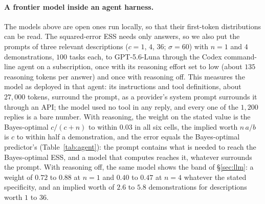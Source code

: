 \documentclass{article}
\begin{document}
\paragraph{A frontier model inside an agent harness.} The models above are open ones run locally, so that their first-token distributions can be read. The squared-error ESS needs only answers, so we also put the prompts of three relevant descriptions ($c = 1$, $4$, $36$; $\sigma = 60$) with $n = 1$ and $4$ demonstrations, $100$ tasks each, to GPT-5.6-Luna through the Codex command-line agent on a subscription, once with its reasoning effort set to low (about $135$ reasoning tokens per answer) and once with reasoning off. This measures the model as deployed in that agent: its instructions and tool definitions, about $27{,}000$ tokens, surround the prompt, as a provider's system prompt surrounds it through an API; the model used no tool in any reply, and every one of the $1{,}200$ replies is a bare number. With reasoning, the weight on the stated value is the Bayes-optimal $c/(c+n)$ to within $0.03$ in all six cells, the implied worth $n\,a/b$ is $c$ to within half a demonstration, and the error equals the Bayes-optimal predictor's (Table~\ref{tab:agent}): the prompt contains what is needed to reach the Bayes-optimal ESS, and a model that computes reaches it, whatever surrounds the prompt. With reasoning off, the same model shows the band of \S\ref{sec:llm}: a weight of $0.72$ to $0.88$ at $n = 1$ and $0.40$ to $0.47$ at $n = 4$ whatever the stated specificity, and an implied worth of $2.6$ to $5.8$ demonstrations for descriptions worth $1$ to $36$.

\begin{table}[h]
\centering\small
\caption{\textbf{A frontier model reaches the Bayes-optimal weight when it reasons and shows the fixed weight of the open models when it does not.} GPT-5.6-Luna inside the Codex agent harness, $100$ tasks per cell, relevant descriptions at $\sigma = 60$; weight on the stated value and implied worth $n\,a/b$ from the regression of \S\ref{sec:llm}; bootstrap standard errors of the weights are at most $0.03$ with reasoning and $0.07$ without.}
\label{tab:agent}

\end{table}

\begin{table}[t]
\centering\scriptsize
\setlength{\tabcolsep}{2.5pt}
\caption{Weight on the stated value, model/Bayes-optimal, for every condition and number of demonstrations shown. Italics as in Table~\ref{tab:llm-worth}.}
\label{tab:llm-full}
\vspace{3pt}

\end{table}
\end{document}
